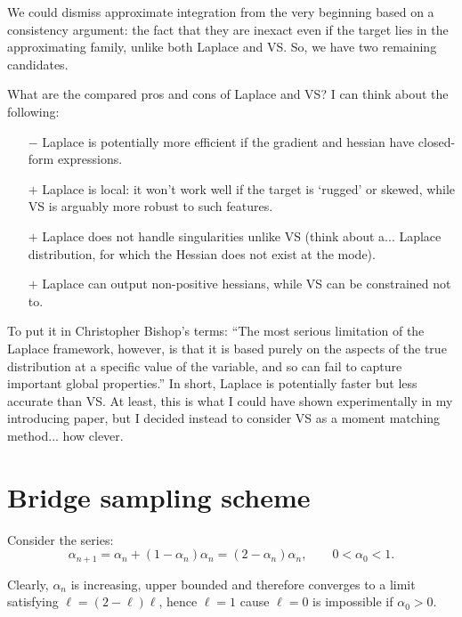 \documentclass{article}
\begin{document}
We could dismiss approximate integration from the very beginning based on a consistency argument: the fact that they are inexact even if the target lies in the approximating family, unlike both Laplace and VS. So, we have two remaining candidates.

What are the compared pros and cons of Laplace and VS? I can think about the following:
\begin{itemize}
\item[$-$] Laplace is potentially more efficient if the gradient and hessian have closed-form expressions.
\item[$+$] Laplace is local: it won't work well if the target is `rugged' or skewed, while VS is arguably more robust to such features. 
\item[$+$] Laplace does not handle singularities unlike VS (think about a... Laplace distribution, for which the Hessian does not exist at the mode).
\item[$+$] Laplace can output non-positive hessians, while VS can be constrained not to.
\end{itemize}

To put it in Christopher Bishop's terms: ``The most serious limitation of the Laplace framework, however, is that it is based purely on the aspects of the true distribution at a specific value of the variable, and so can fail to capture important global properties.'' In short, Laplace is potentially faster but less accurate than VS. At least, this is what I could have shown experimentally in my introducing paper, but I decided instead to consider VS as a moment matching method... how clever.



\section{Bridge sampling scheme}

Consider the series:
$$
\alpha_{n+1}=\alpha_n+(1-\alpha_n)\alpha_n=(2-\alpha_n)\alpha_n,
\qquad
0 < \alpha_0 < 1 .
$$

Clearly, $\alpha_n$ is increasing, upper bounded and therefore converges to a limit satisfying $\ell=(2-\ell)\ell$, hence $\ell=1$ cause $\ell=0$ is impossible if $\alpha_0>0$. 
\end{document}
